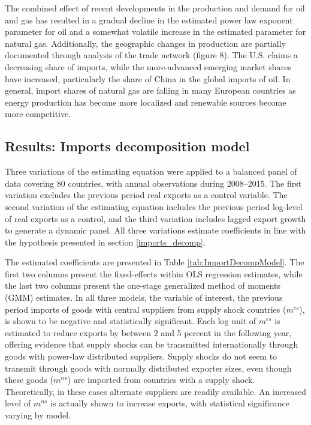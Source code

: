 \documentclass[10pt,letterpaper,pdftex]{article}
\begin{document}
The combined effect of recent developments in the production and demand for oil and gas has resulted in a gradual decline in the estimated power law exponent parameter for oil and a somewhat volatile increase in the estimated parameter for natural gas. Additionally, the geographic changes in production are partially documented through analysis of the trade network (figure 8). The U.S. claims a decreasing share of imports, while the more-advanced emerging market shares have increased, particularly the share of China in the global imports of oil. In general, import shares of natural gas are falling in many European countries as energy production has become more localized and renewable sources become more competitive.

\subsection{Results: Imports decomposition model} \label{results_mdecomp}

Three variations of the estimating equation were applied to a balanced panel of data covering 80 countries, with annual observations during 2008--2015. The first variation excludes the previous period real exports as a control variable. The second variation of the estimating equation includes the previous period log-level of real exports as a control, and the third variation includes lagged export growth to generate a dynamic panel. All three variations estimate coefficients in line with the hypothesis presented in section \ref{imports_decomp}. 

The estimated coefficients are presented in Table \ref{tab:ImportDecompModel}. The first two columns present the fixed-effects within OLS regression estimates, while the last two columns present the one-stage generalized method of moments (GMM) estimates. In all three models, the variable of interest, the previous period imports of goods with central suppliers from supply shock countries ($m^{cs}$), is shown to be negative and statistically significant. Each log unit of $m^{cs}$ is estimated to reduce exports by between 2 and 5 percent in the following year, offering evidence that supply shocks can be transmitted internationally through goods with power-law distributed suppliers. Supply shocks do not seem to transmit through goods with normally distributed exporter sizes, even though these goods ($m^{ns}$) are imported from countries with a supply shock. Theoretically, in these cases alternate suppliers are readily available. An increased level of $m^{ns}$ is actually shown to increase exports, with statistical significance varying by model. 
\end{document}
